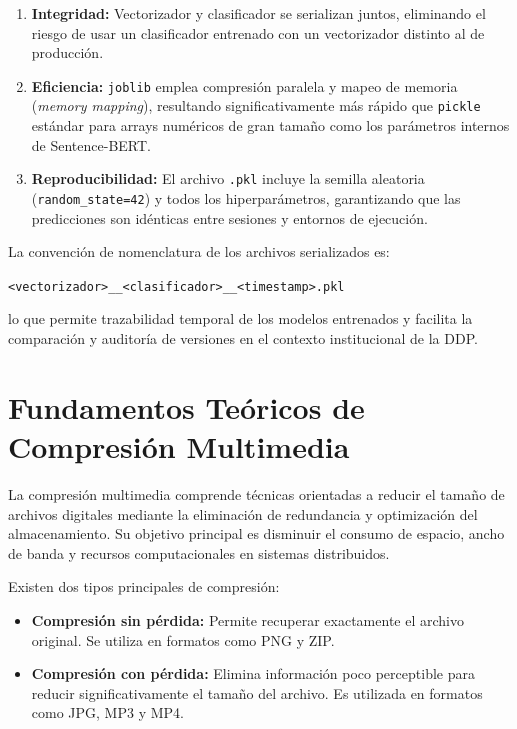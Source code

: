 \begin{enumerate}
  \item \textbf{Integridad:} Vectorizador y clasificador se serializan juntos,
        eliminando el riesgo de usar un clasificador entrenado con un
        vectorizador distinto al de producción.
  \item \textbf{Eficiencia:} \texttt{joblib} emplea compresión paralela y
        mapeo de memoria (\textit{memory mapping}), resultando significativamente
        más rápido que \texttt{pickle} estándar para arrays numéricos de gran
        tamaño como los parámetros internos de Sentence-BERT.
  \item \textbf{Reproducibilidad:} El archivo \texttt{.pkl} incluye la semilla
        aleatoria (\texttt{random\_state=42}) y todos los hiperparámetros,
        garantizando que las predicciones son idénticas entre sesiones y
        entornos de ejecución.
\end{enumerate}

La convención de nomenclatura de los archivos serializados es:

\begin{center}
  \texttt{<vectorizador>\_\_<clasificador>\_\_<timestamp>.pkl}
\end{center}

lo que permite trazabilidad temporal de los modelos entrenados y facilita la
comparación y auditoría de versiones en el contexto institucional de la DDP.

\section{Fundamentos Teóricos de Compresión Multimedia}

La compresión multimedia comprende técnicas orientadas a reducir el tamaño de archivos digitales mediante la eliminación de redundancia y optimización del almacenamiento. Su objetivo principal es disminuir el consumo de espacio, ancho de banda y recursos computacionales en sistemas distribuidos.

Existen dos tipos principales de compresión:

\begin{itemize}
\item \textbf{Compresión sin pérdida:} Permite recuperar exactamente el archivo original. Se utiliza en formatos como PNG y ZIP.
\item \textbf{Compresión con pérdida:} Elimina información poco perceptible para reducir significativamente el tamaño del archivo. Es utilizada en formatos como JPG, MP3 y MP4.
\end{itemize}

